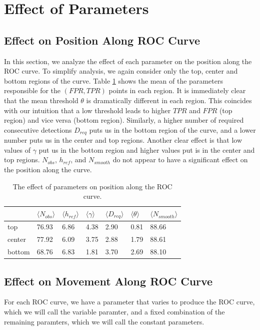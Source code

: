 \section{Effect of Parameters}
\subsection{Effect on Position Along ROC Curve}
\clearpage
In this section, we analyze the effect of each parameter on the position along
the ROC curve. To simplify analysis, we again consider only the top, center and
bottom regions of the curve. Table \ref{tbl:roc_pos} shows the mean of the
parameters responsible for the $(FPR,TPR)$ points in each region. It is
immediately clear that the mean threshold $\theta$ is dramatically different in
each region. This coincides with our intuition that a low threshold leads to
higher $TPR$ and $FPR$ (top region) and vice versa (bottom region). Similarly, a
higher number of required consecutive detections $D_{req}$ puts us in the bottom
region of the curve, and a lower number puts us in the center and top
regions. Another clear effect is that low values of $\gamma$ put us in the
bottom region and higher values put is in the center and top regions. $N_{obs}$, $h_{ref}$, and $N_{smooth}$ do not appear to have a
significant effect on the position along the curve.
\begin{table}
\begin{center}
\begin{tabular}{|l|llllll|}
\hline
& $\langle N_{obs} \rangle$ & $\langle h_{ref} \rangle$ &$\langle \gamma
  \rangle$ & $\langle D_{req} \rangle$ & $\langle \theta \rangle$ & $\langle
  N_{smooth} \rangle$ \\\hline
top & 76.93 & 6.86 & 4.38 & 2.90 & 0.81 & 88.66\\
center & 77.92 & 6.09 & 3.75 & 2.88 & 1.79 & 88.61\\
bottom & 68.76 & 6.83 & 1.81 & 3.70 & 2.69 & 88.10\\
\hline
\end{tabular}
\end{center}
\caption{\label{tbl:roc_pos} The effect of parameters on position along the ROC curve.}
\end{table}

\clearpage
\subsection{Effect on Movement Along ROC Curve}
For each ROC curve, we have a parameter that varies to produce the ROC curve,
which we will call the variable paramter, and a fixed combination of the
remaining paramters, which we will call the constant parameters.

